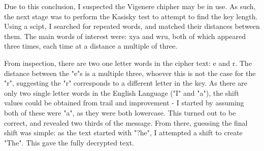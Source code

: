 \documentclass{article}
\begin{document}
    Due to this conclusion, I suspected the Vigenere chipher may be in
    use. As such, the next stage was to perform the Kasisky test to
    attempt to find the key length. Using a scipt, I searched for
    repeated words, and matched their distances between them. The main
    words of interest were: xya and wru, both of which appeared three
    times, each time at a distance a multiple of three.

    From inspection, there are two one letter words in the cipher text:
    e and r. The distance between the "e"s is a multiple three, whoever
    this is not the case for the "r", suggesting the "r" corresponds to
    a different letter in the key. As there are only two single letter
    words in the English Language ("I" and "a"), the shift values could
    be obtained from trail and improvement - I started by assuming both
    of these were "a", as they were both lowercase. This turned out to
    be correct, and revealed two thirds of the message. From there,
    guessing the final shift was simple: as the text started with "?he",
    I attempted a shift to create "The". This gave the fully decrypted
    text.
\end{document}
